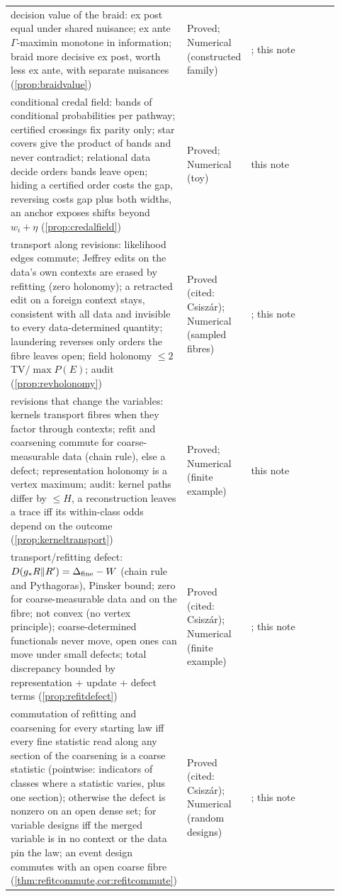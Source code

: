 \documentclass[11pt]{article}
\theoremstyle{definition}\newtheorem{definition}[theorem]{Definition}\newtheorem{remark}[theorem]{Remark}\newtheorem{example}[theorem]{Example}\newtheorem{problem}[theorem]{Open problem}\crefname{problem}{Problem}{Problems}
\begin{document}
{\begin{longtable}{p{0.46\linewidth}p{0.16\linewidth}p{0.3\linewidth}}
\rowcolor{stNew} decision value of the braid: ex post equal under shared nuisance; ex ante $\Gamma$-maximin monotone in information; braid more decisive ex post, worth less ex ante, with separate nuisances (\cref{prop:braidvalue}) & Proved; Numerical (constructed family) & \cite{SeidenfeldWasserman1993}; this note\\
\rowcolor{stNew} conditional credal field: bands of conditional probabilities per pathway; certified crossings fix parity only; star covers give the product of bands and never contradict; relational data decide orders bands leave open; hiding a certified order costs the gap, reversing costs gap plus both widths, an anchor exposes shifts beyond $w_i+\eta$ (\cref{prop:credalfield}) & Proved; Numerical (toy) & this note\\
\rowcolor{stNew} transport along revisions: likelihood edges commute; Jeffrey edits on the data's own contexts are erased by refitting (zero holonomy); a retracted edit on a foreign context stays, consistent with all data and invisible to every data-determined quantity; laundering reverses only orders the fibre leaves open; field holonomy $\le2\,$TV$/\max P(E)$; audit (\cref{prop:revholonomy}) & Proved (cited: Csisz\'ar); Numerical (sampled fibres) & \cite{Csiszar1975}; this note\\
\rowcolor{stNew} revisions that change the variables: kernels transport fibres when they factor through contexts; refit and coarsening commute for coarse-measurable data (chain rule), else a defect; representation holonomy is a vertex maximum; audit: kernel paths differ by $\le H$, a reconstruction leaves a trace iff its within-class odds depend on the outcome (\cref{prop:kerneltransport}) & Proved; Numerical (finite example) & this note\\
\rowcolor{stNew} transport/refitting defect: $D(g_*R\Vert R')=\Delta_{\rm fine}-W$ (chain rule and Pythagoras), Pinsker bound; zero for coarse-measurable data and on the fibre; not convex (no vertex principle); coarse-determined functionals never move, open ones can move under small defects; total discrepancy bounded by representation + update + defect terms (\cref{prop:refitdefect}) & Proved (cited: Csisz\'ar); Numerical (finite example) & \cite{Csiszar1975}; this note\\
\rowcolor{stNew} commutation of refitting and coarsening for every starting law iff every fine statistic read along any section of the coarsening is a coarse statistic (pointwise: indicators of classes where a statistic varies, plus one section); otherwise the defect is nonzero on an open dense set; for variable designs iff the merged variable is in no context or the data pin the law; an event design commutes with an open coarse fibre (\cref{thm:refitcommute,cor:refitcommute}) & Proved (cited: Csisz\'ar); Numerical (random designs) & \cite{Csiszar1975}; this note\\

\end{longtable}}
\end{document}
